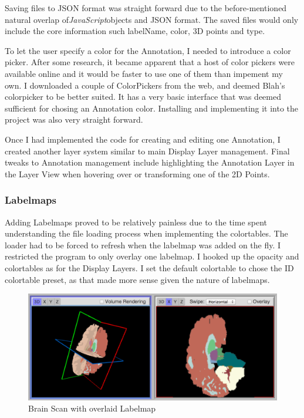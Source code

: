\documentclass[a4paper,11pt,twoside]{article}
\begin{document}
Saving files to JSON format was straight forward due to the before-mentioned natural overlap of\textit{JavaScript}objects and JSON format. The saved files would only include the core information such labelName, color, 3D points and type.

To let the user specify a color for the Annotation, I needed to introduce a color picker. After some research, it became apparent that a host of color pickers were available online and it would be faster to use one of them than impement my own. I downloaded a couple of ColorPickers from the web, and deemed Blah's colorpicker to be better suited. It has a very basic interface that was deemed sufficient for chosing an Annotation color. Installing and implementing it into the project was also very straight forward.

Once I had implemented the code for creating and editing one Annotation, I created another layer system similar to main Display Layer management. Final tweaks to Annotation management include highlighting the Annotation Layer in the Layer View when hovering over or transforming one of the 2D Points.


\subsubsection{Labelmaps}

Adding Labelmaps proved to be relatively painless due to the time spent understanding the file loading process when implementing the colortables. The loader had to be forced to refresh when the labelmap was added on the fly. I restricted the program to only overlay one labelmap. I hooked up the opacity and colortables as for the Display Layers. I set the default colortable to chose the ID colortable preset, as that made more sense given the nature of labelmaps.

\begin{figure}[ht!]
\centering
\includegraphics[width=170mm]{graphics/Labelmap_01.png}
\caption{Brain Scan with overlaid Labelmap}
\label{fig:UIdesign1}
\end{figure}
\end{document}
